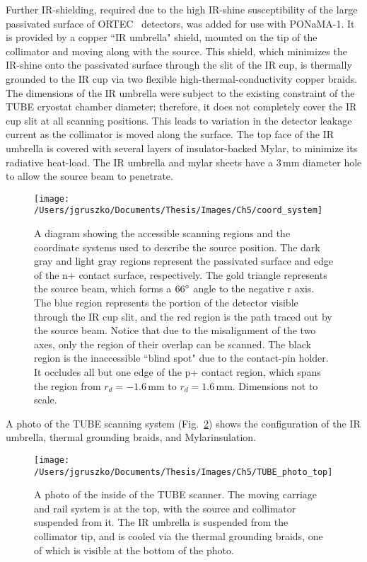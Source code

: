 Further IR-shielding, required due to the high IR-shine susceptibility of the large passivated surface of ORTEC \ppc\ detectors, was added for use with PONaMA-1. It is provided by a copper ``IR umbrella" shield, mounted on the tip of the collimator and moving along with the source. This shield, which minimizes the IR-shine onto the passivated surface through the slit of the IR cup, is thermally grounded to the IR cup via two flexible high-thermal-conductivity copper braids. The dimensions of the IR umbrella were subject to the existing constraint of the TUBE cryostat chamber diameter; therefore, it does not completely cover the IR cup slit at all scanning positions. This leads to variation in the detector leakage current as the collimator is moved along the surface. The top face of the IR umbrella is covered with several layers of insulator-backed Mylar\textsuperscript\textregistered, to minimize its radiative heat-load. The IR umbrella and mylar sheets have a 3\,mm diameter hole to allow the source beam to penetrate. 

\begin{figure}[]
 \texttt{[image: /Users/jgruszko/Documents/Thesis/Images/Ch5/coord\_system]}
 \caption[A diagram showing the accessible regions of the detector surface and the coordinate system of the TUBE scanner]{A diagram showing the accessible scanning regions and the coordinate systems used to describe the source position. The dark gray and light gray regions represent the passivated surface and edge of the n+ contact surface, respectively. The gold triangle represents the source beam, which forms a $66\degree$ angle to the negative r axis. The blue region represents the portion of the detector visible through the IR cup slit, and the red region is the path traced out by the source beam. Notice that due to the misalignment of the two axes, only the region of their overlap can be scanned. The black region is the inaccessible ``blind spot" due to the contact-pin holder. It occludes all but one edge of the p+ contact region, which spans the region from $r_d = -1.6$\,mm to $r_d = 1.6$\,mm. Dimensions not to scale.} 
 \label{fig:scan_coords}
\end{figure}

A photo of the TUBE scanning system (Fig.~\ref{fig:TUBE_photo}) shows the configuration of the IR umbrella, thermal grounding braids, and Mylar\textsuperscript\textregistered insulation. 

\begin{figure}[t]
\centering
 \texttt{[image: /Users/jgruszko/Documents/Thesis/Images/Ch5/TUBE\_photo\_top]}
 \caption[A photo of the inside of the TUBE scanner]{A photo of the inside of the TUBE scanner. The moving carriage and rail system is at the top, with the source and collimator suspended from it. The IR umbrella is suspended from the collimator tip, and is cooled via the thermal grounding braids, one of which is visible at the bottom of the photo.} 
 \label{fig:TUBE_photo}
\end{figure}

